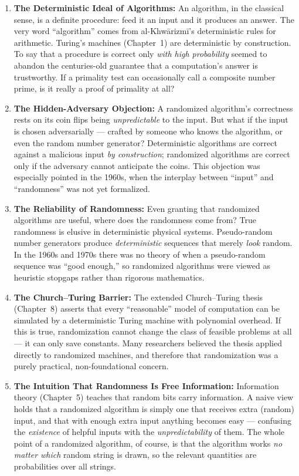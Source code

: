 \begin{enumerate}
\item \textbf{The Deterministic Ideal of Algorithms:} An algorithm, in the classical sense, is a definite procedure: feed it an input and it produces an answer. The very word ``algorithm'' comes from al-Khw\={a}rizm\={i}'s deterministic rules for arithmetic. Turing's machines (Chapter~1) are deterministic by construction. To say that a procedure is correct only \emph{with high probability} seemed to abandon the centuries-old guarantee that a computation's answer is trustworthy. If a primality test can occasionally call a composite number prime, is it really a proof of primality at all?

\item \textbf{The Hidden-Adversary Objection:} A randomized algorithm's correctness rests on its coin flips being \emph{unpredictable} to the input. But what if the input is chosen adversarially --- crafted by someone who knows the algorithm, or even the random number generator? Deterministic algorithms are correct against a malicious input \emph{by construction}; randomized algorithms are correct only if the adversary cannot anticipate the coins. This objection was especially pointed in the 1960s, when the interplay between ``input'' and ``randomness'' was not yet formalized.

\item \textbf{The Reliability of Randomness:} Even granting that randomized algorithms are useful, where does the randomness come from? True randomness is elusive in deterministic physical systems. Pseudo-random number generators produce \emph{deterministic} sequences that merely \emph{look} random. In the 1960s and 1970s there was no theory of when a pseudo-random sequence was ``good enough,'' so randomized algorithms were viewed as heuristic stopgaps rather than rigorous mathematics.

\item \textbf{The Church--Turing Barrier:} The extended Church--Turing thesis (Chapter~8) asserts that every ``reasonable'' model of computation can be simulated by a deterministic Turing machine with polynomial overhead. If this is true, randomization cannot change the class of feasible problems at all --- it can only save constants. Many researchers believed the thesis applied directly to randomized machines, and therefore that randomization was a purely practical, non-foundational concern.

\item \textbf{The Intuition That Randomness Is Free Information:} Information theory (Chapter~5) teaches that random bits carry information. A naive view holds that a randomized algorithm is simply one that receives extra (random) input, and that with enough extra input anything becomes easy --- confusing the \emph{existence} of helpful inputs with the \emph{unpredictability} of them. The whole point of a randomized algorithm, of course, is that the algorithm works \emph{no matter which} random string is drawn, so the relevant quantities are probabilities over all strings.
\end{enumerate}

